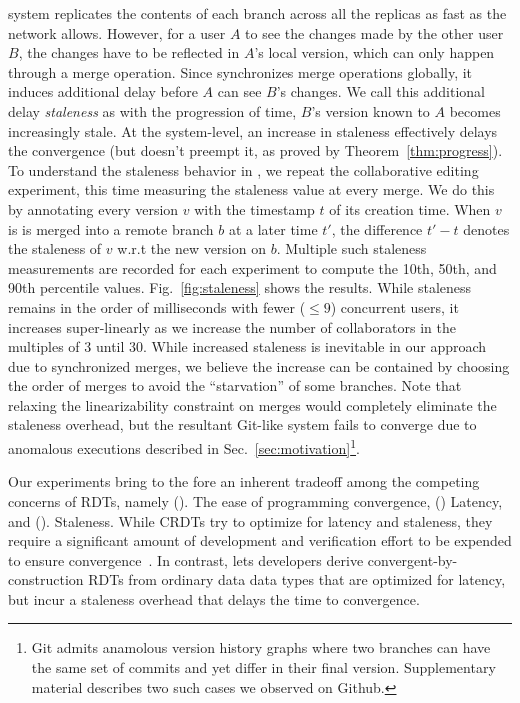 \quark system replicates the contents of each branch across all the
replicas as fast as the network allows. However, for a user $A$ to
see the changes made by the other user $B$, the changes have to be
reflected in $A$'s local version, which can only happen through a
merge operation. Since \quark synchronizes merge operations globally,
it induces additional delay before $A$ can see $B$'s changes. We call
this additional delay \emph{staleness} as with the progression of
time, $B$'s version known to $A$ becomes increasingly stale. At the
system-level, an increase in staleness effectively delays the
convergence (but doesn't preempt it, as proved by
Theorem~\ref{thm:progress}). To understand the staleness behavior in
\quark, we repeat the collaborative editing experiment, this time
measuring the staleness value at every merge. We do this by annotating
every version $v$ with the timestamp $t$ of its creation time. When
$v$ is is merged into a remote branch $b$ at a later time $t'$, the
difference $t' - t$ denotes the staleness of $v$ w.r.t the new version
on $b$. Multiple such staleness measurements are recorded for each
experiment to compute the 10th, 50th, and 90th percentile
values. Fig.~\ref{fig:staleness} shows the results. While
staleness remains in the order of milliseconds with fewer ($\leq 9$)
concurrent users, it increases super-linearly as we increase the
number of collaborators in the multiples of 3 until 30. While
increased staleness is inevitable in our approach due to synchronized
merges, we believe the increase can be contained by choosing the order
of merges to avoid the ``starvation'' of some branches. Note that
relaxing the linearizability constraint on merges would completely
eliminate the staleness overhead, but the resultant Git-like system
fails to converge due to anomalous executions described in
Sec.~\ref{sec:motivation}\footnote{
  Git admits anamolous version history graphs where two branches can
  have the same set of commits and yet differ in their final version.
  Supplementary material describes two such cases we observed on
  Github.}. 

Our experiments bring to the fore an inherent tradeoff among the
competing concerns of RDTs, namely (). The ease of programming
convergence, () Latency, and ().  Staleness. While CRDTs
try to optimize for latency and staleness, they require a significant
amount of development and verification effort to be expended to ensure
convergence~\cite{kleppmann2017}. In contrast, \quark lets developers
derive convergent-by-construction RDTs from ordinary data data types
that are optimized for latency, but incur a staleness overhead that
delays the time to convergence. 


